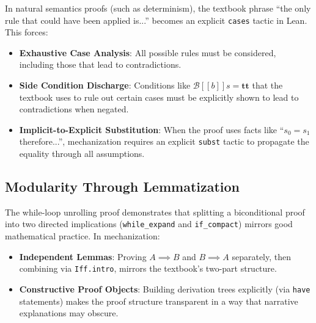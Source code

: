 In natural semantics proofs (such as determinism), the textbook phrase
``the only rule that could have been applied is...'' becomes an explicit
\texttt{cases} tactic in Lean. This forces:

\begin{itemize}
    \item \textbf{Exhaustive Case Analysis}:
    All possible rules must be considered, including those that lead to
    contradictions.
    
    \item \textbf{Side Condition Discharge}:
    Conditions like $\mathcal{B}[\![b]\!]s = \mathbf{tt}$ that the textbook
    uses to rule out certain cases must be explicitly shown to lead to contradictions when negated.
    
    \item \textbf{Implicit-to-Explicit Substitution}:
    When the proof uses facts like ``$s_0 = s_1$ therefore...'', mechanization
    requires an explicit \texttt{subst} tactic to propagate the equality
    through all assumptions.
\end{itemize}

\subsection*{Modularity Through Lemmatization}

The while-loop unrolling proof demonstrates that splitting a biconditional
proof into two directed implications (\texttt{while\_expand} and
\texttt{if\_compact}) mirrors good mathematical practice. In mechanization:

\begin{itemize}
    \item \textbf{Independent Lemmas}:
    Proving $A \implies B$ and $B \implies A$ separately, then combining via
    \texttt{Iff.intro}, mirrors the textbook's two-part structure.
    \item \textbf{Constructive Proof Objects}:
    Building derivation trees explicitly (via \texttt{have} statements) makes
    the proof structure transparent in a way that narrative explanations may
    obscure.
\end{itemize}

